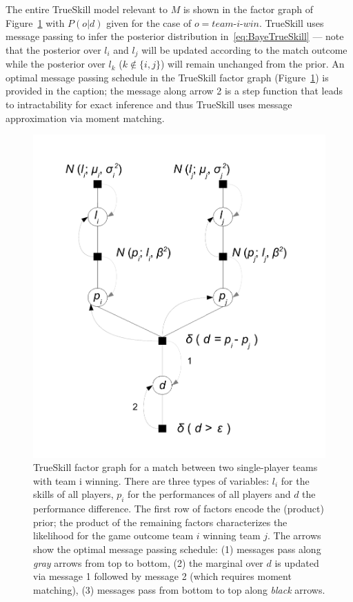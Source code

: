 The entire TrueSkill model relevant to $M$ is shown in the
factor graph of Figure~\ref{fig:trueskill} with $P(o|d)$ given
for the case of $o = \textit{team-i-win}$.
TrueSkill uses message passing %
to infer the posterior distribution in~\eqref{eq:BayeTrueSkill} ---
note that the posterior over $l_i$ and $l_j$ will be
updated according to the match
outcome while the posterior over
$l_k$ ($k \notin \{ i,j \}$) will remain unchanged from
the prior.  An optimal message passing schedule in the TrueSkill
factor graph (Figure~\ref{fig:trueskill}) is provided in the caption;
the message along arrow 2 is a step function that leads to
intractability for exact inference and thus TrueSkill uses message
approximation via moment matching.

\begin{figure}[t!]
\centerline{\includegraphics[scale=0.3]{TrueSkill}}
\caption{\small TrueSkill factor graph for a match between two single-player
teams with team i winning.
There are three types of variables: $l_i$
for the skills of all players, $p_i$ for the performances of all
players and $d$ the performance difference. The first row of factors
encode the (product) prior; the product of the remaining factors
characterizes the likelihood for the game outcome team $i$ winning team $j$.
The arrows show the optimal message passing schedule: (1)
messages pass along \emph{gray} arrows from top to bottom, (2) the
marginal over $d$ is updated via message 1 followed by message 2
(which requires moment matching), (3) messages pass from bottom to top
along \emph{black} arrows.}
\label{fig:trueskill}
\vspace{-3mm}
\end{figure}

